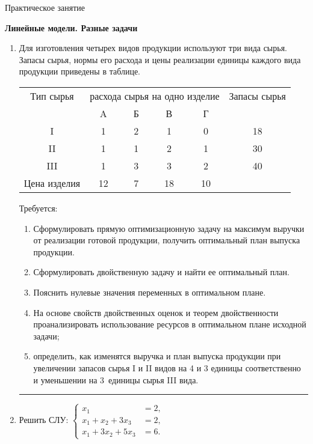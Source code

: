 \documentclass[a5paper,10pt]{extarticle}
\begin{document}
{\centering \small Практическое занятие \par\bfseries \large Линейные модели. Разные задачи\par}

\begin{enumerate}

 \item 
Для изготовления четырех видов продукции используют три вида сырья.
Запасы сырья, нормы его расхода и цены реализации единицы каждого вида продукции
приведены в таблице.

{\centering
\begin{tabular}{cccccc}
\hline
Тип сырья & \multicolumn{4}{p{4.5cm}}{ расхода сырья на одно изделие} & Запасы сырья\\
	& A & Б	& В	& Г & 	\\
\hline
I 	& 1 & 2	& 1	& 0	& 18\\
II 	& 1 & 1	& 2	& 1 & 30\\
III & 1	& 3	& 3 & 2	& 40 \\
\hline
Цена изделия & 12 & 7 & 18 & 10 & \\
\hline
\end{tabular}
\par}
Требуется:
\begin{enumerate}
\item 
Сформулировать прямую оптимизационную задачу на максимум выручки от
реализации готовой продукции, получить оптимальный план выпуска продукции.
\item 
	Сформулировать двойственную задачу и найти ее оптимальный план.
\item 
	Пояснить нулевые значения переменных в оптимальном плане.
\item 
	На основе свойств двойственных оценок и теорем двойственности проанализировать использование ресурсов в оптимальном плане исходной задачи;
\item 
	определить, как изменятся выручка и план выпуска продукции при увеличении запасов сырья I и II видов на 4 и 3 единицы соответственно и уменьшении на 3~единицы сырья III вида.
\end{enumerate}

\hrule
	\item Решить СЛУ:
	$\left\lbrace\begin{aligned}
     x_1 &= 2,\\
     x_1+x_2+3x_3 &= 2,\\
     x_1+3x_2+5x_3 &= 6.
    \end{aligned}\right.$


\end{enumerate}
\end{document}
